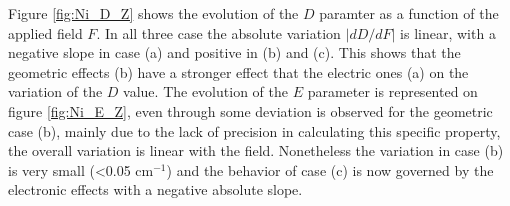 \documentclass[10pt]{report}
\numberwithin{equation}{section}
\begin{document}

Figure \ref{fig:Ni_D_Z} shows the evolution of the $D$ paramter as a function of the applied field $F$.
In all three case the absolute variation $|dD/dF|$ is linear, with a negative slope in case (a) and positive in (b) and (c).
This shows that the geometric effects (b) have a stronger effect that the electric ones (a) on the variation of the $D$ value.
The evolution of the $E$ parameter is represented on figure \ref{fig:Ni_E_Z}, even through some deviation is observed for the geometric case (b), mainly due to the lack of precision in calculating this specific property, the overall variation is linear with the field.
Nonetheless the variation in case (b) is very small (<0.05 cm$^{-1}$) and the behavior of case (c) is now governed by the electronic effects with a negative absolute slope.
\end{document}
